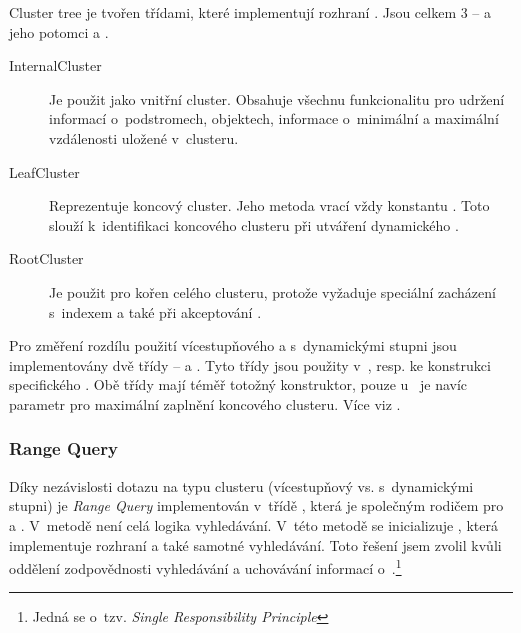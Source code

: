 Cluster tree je tvořen třídami, které implementují rozhraní \linebreak {}. Jsou celkem 3 -- 
 a jeho potomci   a .

\begin{description}
\item[InternalCluster] Je použit jako vnitřní cluster. Obsahuje všechnu funkcionalitu pro udržení informací o~podstromech, objektech, informace o~minimální a maximální vzdálenosti uložené v~clusteru.
\item[LeafCluster] Reprezentuje koncový cluster. Jeho metoda \linebreak {} vrací vždy konstantu . Toto slouží k~identifikaci koncového clusteru při utváření dynamického .
\item[RootCluster] Je použit pro kořen celého clusteru, protože vyžaduje speciální zacházení s~indexem a také při akceptování .
\end{description}

Pro změření rozdílu použití vícestupňového  a  s~dynamickými stupni jsou implementovány dvě třídy -- \linebreak {} a \linebreak {}. Tyto třídy jsou použity v~, \linebreak resp.  ke konstrukci specifického .
Obě třídy mají téměř totožný konstruktor, pouze \linebreak u~ je navíc parametr pro maximální zaplnění koncového clusteru. Více viz .

\subsubsection{Range Query}
Díky nezávislosti dotazu na typu clusteru (vícestupňový vs. s~dynamickými stupni) je \emph{Range Query} implementován v~třídě , která je společným rodičem pro  a .
V~metodě  není celá logika vyhledávání.
 V~této metodě se inicializuje , která implementuje rozhraní  a také samotné vyhledávání.
Toto řešení jsem zvolil kvůli oddělení zodpovědnosti vyhledávání a uchovávání informací o~.\footnote{Jedná se o~tzv. \emph{Single Responsibility Principle}\cite{martin2003agile}}

